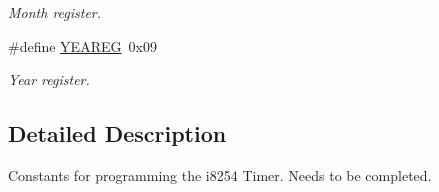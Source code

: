 \begin{DoxyCompactItemize}
$$\begin{DoxyCompactList}\small\item\em Month register. \end{DoxyCompactList}\item 
\hypertarget{group__rtcmacro_gab6a23fdf0355f6d0fa7118ef326a7053}{}\label{group__rtcmacro_gab6a23fdf0355f6d0fa7118ef326a7053} 
\#define \hyperlink{group__rtcmacro_gab6a23fdf0355f6d0fa7118ef326a7053}{Y\+E\+A\+R\+EG}~0x09
\begin{DoxyCompactList}\small\item\em Year register. \end{DoxyCompactList}\end{DoxyCompactItemize}


\subsection{Detailed Description}
Constants for programming the i8254 Timer. Needs to be completed. 

